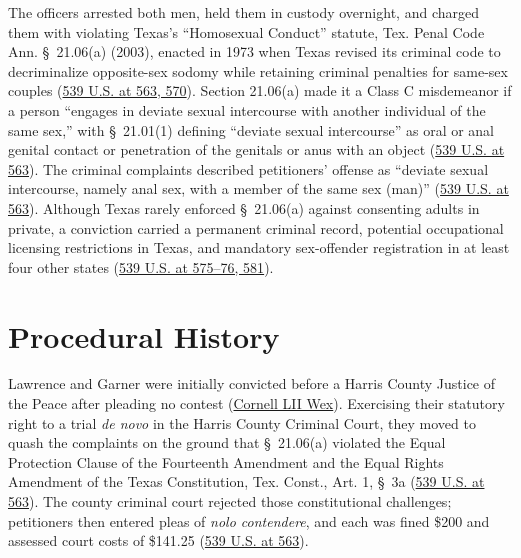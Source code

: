 \documentclass[12pt]{article}
\begin{document}
The officers arrested both men, held them in custody overnight, and charged them with violating Texas's ``Homosexual Conduct'' statute, Tex. Penal Code Ann. \S~21.06(a) (2003), enacted in 1973 when Texas revised its criminal code to decriminalize opposite-sex sodomy while retaining criminal penalties for same-sex couples (\href{https://www.law.cornell.edu/supremecourt/text/02-102}{539 U.S. at 563, 570}). Section 21.06(a) made it a Class C misdemeanor if a person ``engages in deviate sexual intercourse with another individual of the same sex,'' with \S~21.01(1) defining ``deviate sexual intercourse'' as oral or anal genital contact or penetration of the genitals or anus with an object (\href{https://www.law.cornell.edu/supremecourt/text/02-102}{539 U.S. at 563}). The criminal complaints described petitioners' offense as ``deviate sexual intercourse, namely anal sex, with a member of the same sex (man)'' (\href{https://www.law.cornell.edu/supremecourt/text/02-102}{539 U.S. at 563}). Although Texas rarely enforced \S~21.06(a) against consenting adults in private, a conviction carried a permanent criminal record, potential occupational licensing restrictions in Texas, and mandatory sex-offender registration in at least four other states (\href{https://www.law.cornell.edu/supremecourt/text/02-102}{539 U.S. at 575--76, 581}).

\section{Procedural History}
Lawrence and Garner were initially convicted before a Harris County Justice of the Peace after pleading no contest (\href{https://www.law.cornell.edu/wex/lawrence_v._texas}{Cornell LII Wex}). Exercising their statutory right to a trial \textit{de novo} in the Harris County Criminal Court, they moved to quash the complaints on the ground that \S~21.06(a) violated the Equal Protection Clause of the Fourteenth Amendment and the Equal Rights Amendment of the Texas Constitution, Tex. Const., Art. 1, \S~3a (\href{https://www.law.cornell.edu/supremecourt/text/02-102}{539 U.S. at 563}). The county criminal court rejected those constitutional challenges; petitioners then entered pleas of \textit{nolo contendere}, and each was fined \$200 and assessed court costs of \$141.25 (\href{https://www.law.cornell.edu/supremecourt/text/02-102}{539 U.S. at 563}).
\end{document}
